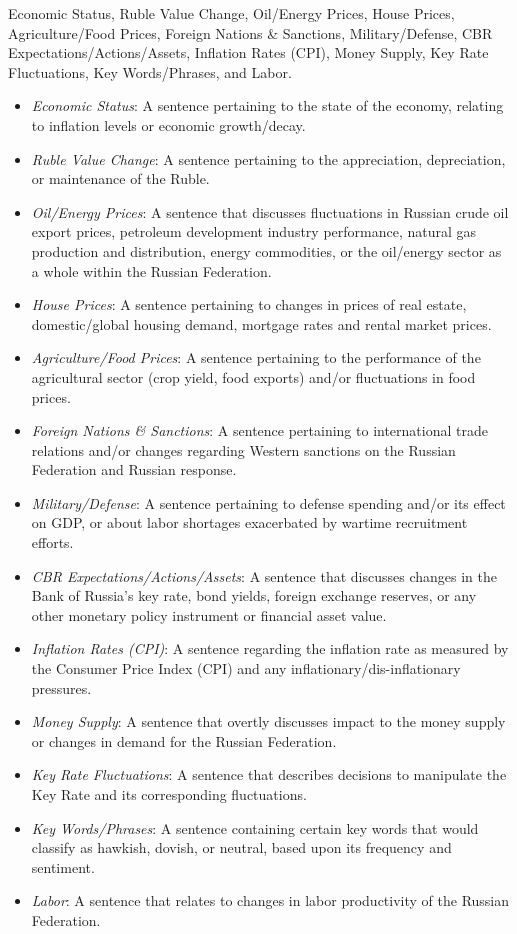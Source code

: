  Economic Status, Ruble Value Change, Oil/Energy Prices, House Prices, Agriculture/Food Prices, Foreign Nations \& Sanctions, Military/Defense, CBR Expectations/Actions/Assets, Inflation Rates (CPI), Money Supply, Key Rate Fluctuations, Key Words/Phrases, and Labor.
\begin{itemize}
    \item \emph{Economic Status}: A sentence pertaining to the state of the economy, relating to inflation levels or economic growth/decay. 
    \item \emph{Ruble Value Change}: A sentence pertaining to the appreciation, depreciation, or maintenance of the Ruble.
    \item \emph{Oil/Energy Prices}: A sentence that discusses fluctuations in Russian crude oil export prices, petroleum development industry performance, natural gas production and distribution, energy commodities, or the oil/energy sector as a whole within the Russian Federation. 
    \item \emph{House Prices}: A sentence pertaining to changes in prices of real estate, domestic/global housing demand, mortgage rates and rental market prices.
    \item \emph{Agriculture/Food Prices}: A sentence pertaining to the performance of the agricultural sector (crop yield, food exports) and/or fluctuations in food prices.
    \item \emph{Foreign Nations \& Sanctions}: A sentence pertaining to international trade relations and/or changes regarding Western sanctions on the Russian Federation and Russian response. 
    \item \emph{Military/Defense}: A sentence pertaining to defense spending and/or its effect on GDP, or about labor shortages exacerbated by wartime recruitment efforts. 
    \item \emph{CBR Expectations/Actions/Assets}: A sentence that discusses changes in the Bank of Russia's key rate, bond yields, foreign exchange reserves, or any other monetary policy instrument or financial asset value.
    \item \emph{Inflation Rates (CPI)}: A sentence regarding the inflation rate as measured by the Consumer Price Index (CPI) and any inflationary/dis-inflationary pressures. 
    \item \emph{Money Supply}: A sentence that overtly discusses impact to the money supply or changes in demand for the Russian Federation.
    \item \emph{Key Rate Fluctuations}: A sentence that describes decisions to manipulate the Key Rate and its corresponding fluctuations.
    \item \emph{Key Words/Phrases}: A sentence containing certain key words that would classify as hawkish, dovish, or neutral, based upon its frequency and sentiment.
    \item \emph{Labor}: A sentence that relates to changes in labor productivity of the Russian Federation.
\end{itemize}

